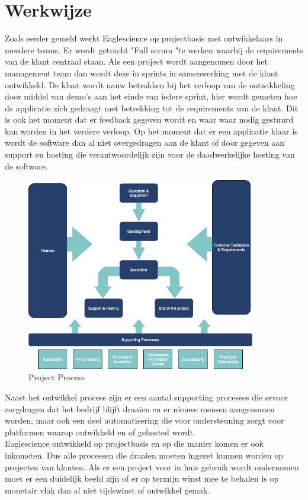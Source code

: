 \section{Werkwijze}
Zoals eerder gemeld werkt Eaglescience op projectbasis met ontwikkelaars in meedere teams. Er wordt getracht "Full scrum "te werken waarbij de requirements van de klant centraal staan. Als een project wordt aangenomen door het management team dan wordt deze in sprints in samenwerking met de klant ontwikkeld. De klant wordt nauw betrokken bij het verloop van de ontwikkeling door middel van demo's aan het einde van iedere sprint, hier wordt gemeten hoe de applicatie zich gedraagt met betrekking tot de requirements van de klant. Dit is ook het moment dat er feedback gegeven wordt en waar waar nodig gestuurd kan worden in het verdere verloop. Op het moment dat er een applicatie klaar is wordt de software dan al niet overgedragen aan de klant of door gegeven aan support en hosting die verantwoordelijk zijn voor de daadwerkelijke hosting van de software.
\begin{figure}[bth]
\myfloatalign
\includegraphics[width=10cm]{gfx/ProcessFlow}
\caption{Project Process}
\label{fig:Project Process}
\end{figure}
Naast het ontwikkel process zijn er een aantal supporting processes die ervoor zorgdragen dat het bedrijf blijft draaien en er nieuwe mensen aangenomen worden, maar ook een deel automatisering die voor ondersteuning zorgt voor platformen waarop ontwikkeld en of gehosted wordt.\\
Eaglescience ontwikkeld op projectbasis en op die manier komen er ook inkomsten. Dus alle processen die draaien moeten ingezet kunnen worden op projecten van klanten. Als er een project voor in huis gebruik wordt ondernomen moet er een duidelijk beeld zijn of er op termijn winst mee te behalen is op monetair vlak dan al niet tijdswinst of ontwikkel gemak.

